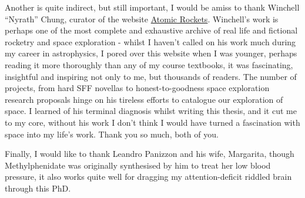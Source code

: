 \begin{acknowledgements}
Another is quite indirect, but still important, I would be amiss to thank Winchell ``Nyrath'' Chung, curator of the website \href{http://www.projectrho.com/public_html/rocket/}{Atomic Rockets}.
Winchell's work is perhaps one of the most complete and exhaustive archive of real life and fictional rocketry and space exploration - whilst I haven't called on his work much during my career in astrophysics, I pored over this website when I was younger, perhaps reading it more thoroughly than any of my course textbooks, it was fascinating, insightful and inspiring not only to me, but thousands of readers.
The number of projects, from hard SFF novellas to honest-to-goodness space exploration research proposals hinge on his tireless efforts to catalogue our exploration of space.
I learned of his terminal diagnosis whilst writing this thesis, and it cut me to my core, without his work I don't think I would have turned a fascination with space into my life's work.
Thank you so much, both of you.

Finally, I would like to thank Leandro Panizzon and his wife, Margarita, though Methylphenidate was originally synthesised by him to treat her low blood pressure, it also works quite well for dragging my attention-deficit riddled brain through this PhD.

\end{acknowledgements}


